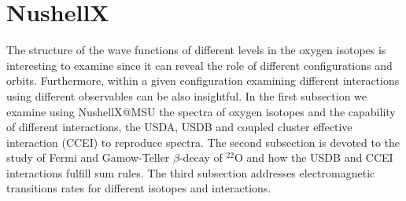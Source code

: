\section{NushellX}
The structure of the wave functions of different levels in the oxygen isotopes is interesting to examine since it can reveal the role of different configurations and orbits. Furthermore, within a given configuration examining different interactions using different observables can be also insightful. 
In the first subsection we examine using NushellX@MSU the spectra of oxygen isotopes and the capability of different interactions, the USDA, USDB and coupled cluster effective interaction (CCEI) \cite{Jansen2016} to reproduce spectra. The second subsection is devoted to the study of Fermi and Gamow-Teller $\beta$-decay of $^{22}$O and how the USDB and CCEI interactions fulfill sum rules. The third subsection addresses electromagnetic transitions rates for different isotopes and interactions.
